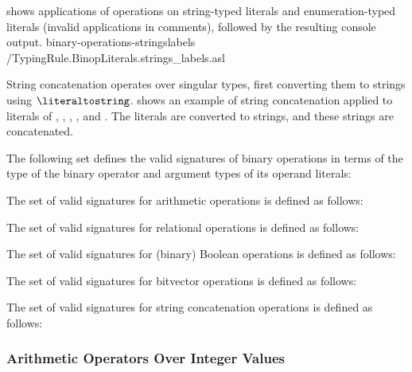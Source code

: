 
 shows applications
of operations on string-typed literals and enumeration-typed literals (invalid applications in comments),
followed by the resulting console output.
  {binary-operations-stringslabels}
  {\typingtests/TypingRule.BinopLiterals.strings_labels.asl}


String concatenation operates over singular types, first converting them to strings using $\literaltostring$.
 shows an example of string concatenation applied to literals of \integertypeterm{}, \bitvectortypeterm{}, \realtypeterm{}, \booleantypeterm{}, and \enumerationtypeterm{}.
The literals are converted to strings, and these strings are concatenated.

The following set defines the valid signatures of
binary operations in terms of the type of the binary operator
and argument types of its operand literals:

The set of valid signatures for arithmetic operations is defined as follows:

The set of valid signatures for relational operations is defined as follows:

The set of valid signatures for (binary) Boolean operations is defined as follows:

The set of valid signatures for bitvector operations is defined as follows:

The set of valid signatures for string concatenation operations is defined as follows:


\subsubsection{Arithmetic Operators Over Integer Values \label{sec:AthimeticOverInt}}

